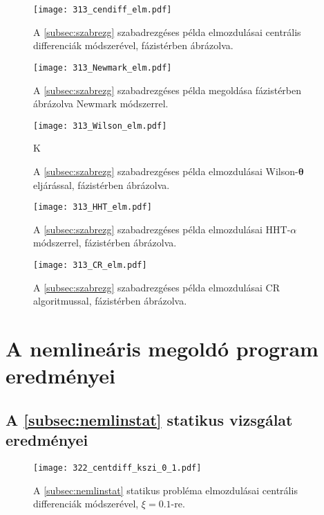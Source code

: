 \begin{figure}[H]
\centering
\texttt{[image: 313\_cendiff\_elm.pdf]}
\caption{A \ref{subsec:szabrezg} szabadrezgéses példa elmozdulásai centrális differenciák módszerével, fázistérben ábrázolva.}
\end{figure}

\begin{figure}[H]
\centering
\texttt{[image: 313\_Newmark\_elm.pdf]}
\caption{A \ref{subsec:szabrezg} szabadrezgéses példa megoldása fázistérben ábrázolva Newmark módszerrel.}
\end{figure}

\begin{figure}[H]
\centering
\texttt{[image: 313\_Wilson\_elm.pdf]}
\caption{A \ref{subsec:szabrezg} szabadrezgéses példa elmozdulásai Wilson-$\boldsymbol\theta$ eljárással, fázistérben ábrázolva.}
K\label{fig:függszabrezg_er_elm_wilson}
\end{figure}

\begin{figure}[H]
\centering
\texttt{[image: 313\_HHT\_elm.pdf]}
\caption{A \ref{subsec:szabrezg} szabadrezgéses példa elmozdulásai HHT-$\alpha$ módszerrel, fázistérben ábrázolva.}
\end{figure}

\begin{figure}[H]
\centering
\texttt{[image: 313\_CR\_elm.pdf]}
\caption{A \ref{subsec:szabrezg} szabadrezgéses példa elmozdulásai CR algoritmussal, fázistérben ábrázolva.}
\end{figure}

\section{A nemlineáris megoldó program eredményei}

\subsection{A \ref{subsec:nemlinstat} statikus vizsgálat eredményei}\label{sec:függ 322}


\begin{figure}[H]
\centering
\texttt{[image: 322\_centdiff\_kszi\_0\_1.pdf]}
\caption{A \ref{subsec:nemlinstat} statikus probléma elmozdulásai centrális differenciák módszerével, $\xi = 0.1$-re.}
\label{fig:függ322_centdiff_0_1}
\end{figure}

